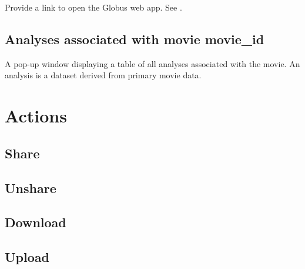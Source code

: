 Provide a link to open the Globus web app. See .

\subsection{Analyses associated with movie movie\_id}

A pop-up window displaying a table of all analyses associated with the movie. An analysis 
is a dataset derived from primary movie data.

\section{Actions}
\subsection{Share}
\subsection{Unshare}
\subsection{Download}
\subsection{Upload}

